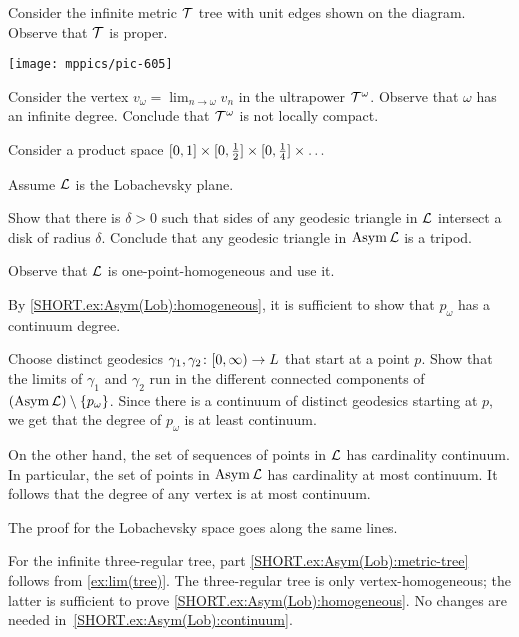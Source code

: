  Consider the infinite metric $\mathcal{T}$ tree with unit edges shown
on the diagram.
Observe that $\mathcal{T}$ is proper.

\begin{Figure}
\vskip-0mm
\centering
\texttt{[image: mppics/pic-605]}
\end{Figure}

Consider the vertex $v_\omega=\lim_{n\to\omega}v_n$ in the ultrapower $\mathcal{T}^\omega$.
Observe that $\omega$ has an infinite degree.
Conclude that $\mathcal{T}^\omega$ is not locally compact.

Consider a product space $[0,1]\z\times[0,\tfrac12]\z\times[0,\tfrac14]\z\times\dots$

 Assume $\mathcal{L}$ is the Lobachevsky plane.

Show that there is $\delta>0$ such that sides of any geodesic triangle in $\mathcal{L}$ intersect a disk of radius $\delta$.
Conclude that any geodesic triangle in $\mathop{\rm Asym}\nolimits\mathcal{L}$ is a tripod.

 Observe that $\mathcal{L}$ is one-point-homogeneous and use it.

By \ref{SHORT.ex:Asym(Lob):homogeneous}, it is sufficient to show that $p_\omega$ has a continuum degree.

Choose distinct geodesics $\gamma_1,\gamma_2\:[0,\infty)\z\to L$ that start at a point $p$.
Show that the limits of $\gamma_1$ and $\gamma_2$ run in the different connected components of $(\mathop{\rm Asym}\nolimits\mathcal{L})\setminus \{p_\omega\}$.
Since there is a continuum of distinct geodesics starting at $p$,
we get that the degree of $p_\omega$ is at least continuum.

On the other hand, the set of sequences of points in $\mathcal{L}$  has cardinality continuum.
In particular, the set of points in $\mathop{\rm Asym}\nolimits\mathcal{L}$ has cardinality at most continuum.
It follows that the degree of any vertex is at most continuum.

The proof for the Lobachevsky space goes along the same lines.

For the infinite three-regular tree, part \ref{SHORT.ex:Asym(Lob):metric-tree} follows from \ref{ex:lim(tree)}.
The three-regular tree is only vertex-homogeneous; the latter is sufficient to prove \ref{SHORT.ex:Asym(Lob):homogeneous}.
No changes are needed in~\ref{SHORT.ex:Asym(Lob):continuum}.

